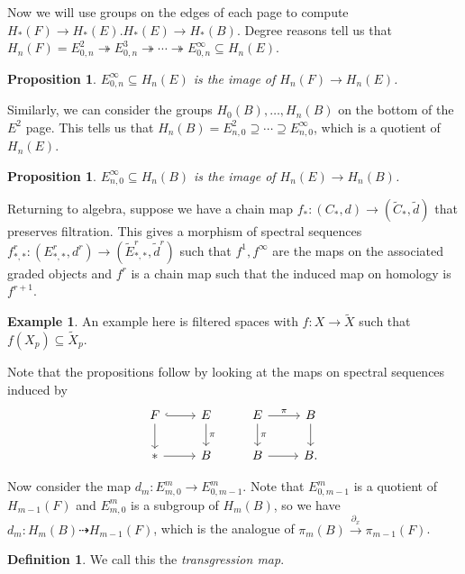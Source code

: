 \documentclass[leqno, openany]{memoir}
\newtheorem{prop}[thm]{Proposition}
\theoremstyle{definition}
\newtheorem{defn}[thm]{Definition}
\newtheorem{exm}[thm]{Example}
\theoremstyle{remark}
\theoremstyle{plain}
\theoremstyle{definition}
\theoremstyle{remark}
\newcommand{\wt}[1]{\widetilde{#1}}
\begin{document}
Now we will use groups on the edges of each page to compute $H_*(F) \to H_*(E).
H_*(E) \to H_*(B)$.  Degree reasons tell us that $H_n(F) = E_{0,n}^2
\twoheadrightarrow E_{0,n}^3 \twoheadrightarrow \cdots \twoheadrightarrow
E_{0,n}^{\infty} \subseteq H_n(E)$.

\begin{prop} $E_{0,n}^{\infty} \subseteq H_n(E)$ is the image of $H_n(F) \to
H_n(E)$.  \end{prop}

Similarly, we can consider the groups $H_0(B), \ldots, H_n(B)$ on the bottom of
the $E^2$ page. This tells us that $H_n(B) = E_{n,0}^2 \supseteq \cdots
\supseteq E_{n,0}^{\infty}$, which is a quotient of $H_n(E)$.

\begin{prop} $E_{n,0}^{\infty} \subseteq H_n(B)$ is the image of $H_n(E) \to
H_n(B)$.  \end{prop}

Returning to algebra, suppose we have a chain map $f_* \colon (C_*, d) \to
(\wt{C}_*, \wt{d})$ that preserves filtration. This gives a morphism of
spectral sequences $f_{*,*}^r \colon (E_{*,*}^r, d^r) \to (\wt{E}_{*,*}^r,
\wt{d}^r)$ such that $f^1, f^{\infty}$ are the maps on the associated graded
objects and $f^r$ is a chain map such that the induced map on homology is
$f^{r+1}$.

\begin{exm} An example here is filtered spaces with $f \colon X \to \wt{X}$
such that $f(X_p) \subseteq \wt{X}_p$.  \end{exm}

Note that the propositions follow by looking at the maps on spectral sequences
induced by \begin{equation*} \begin{tikzcd} F \arrow[hookrightarrow]{r}
    \arrow{d} & E \arrow{d}{\pi} & E \arrow{r}{\pi} \arrow{d}{\pi} & B
    \arrow{d} \\ {*} \arrow{r} & B & B \arrow{r} & B.  \end{tikzcd}
\end{equation*}

Now consider the map $d_m \colon E_{m,0}^m \to E_{0,m-1}^m$. Note that
$E_{0,m-1}^m$ is a quotient of $H_{m-1}(F)$ and $E_{m,0}^m$ is a subgroup of
$H_m(B)$, so we have $d_m \colon H_m(B) \dashrightarrow H_{m-1}(F)$, which is
the analogue of $\pi_m(B) \xrightarrow{\partial_x} \pi_{m-1}(F)$.

\begin{defn} We call this the \textit{transgression map}.  \end{defn}
\end{document}
